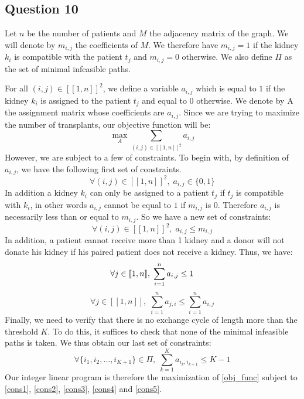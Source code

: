 \documentclass[english]{article}
\begin{document}
\subsection*{Question 10}

Let $n$ be the number of patients and $M$ the adjacency matrix of the graph. We will denote by $ m_ {i, j} $ the coefficients of $M$. We therefore have $m_{i, j} = 1$ if the kidney $k_i$ is compatible with
the patient $t_j$ and $m_{i, j} = 0$ otherwise. We also define $\Pi$ as the set of minimal infeasible paths. 

For all $(i, j) \in {[\![1, n]\!]}^2$, we define a variable $a_{i,j}$ which is equal to $1$ if the kidney $k_i$ is assigned to the patient $t_j$ and equal to $0$ otherwise. We denote by A the assignment matrix whose coefficients are $a_{i, j}$. Since we are trying to maximize the number of transplants, our objective function will be:
\begin{equation}\label{obj_func}
    \max_{A} \sum_{(i, j) \in {[\![1, n]\!]}^2} a_{i,j}
\end{equation}
However, we are subject to a few of constraints. To begin with, by definition of $a_{i, j}$, we have the following first set of constraints.
\begin{equation}\label{cons1}
    \forall (i, j) \in {[\![1, n]\!]}^2, \; a_{i,j} \in \{0, 1\}
\end{equation}
In addition a kidney $ k_i $ can only be assigned to a patient $ t_j $ if $ t_j $ is compatible with $ k_i $, in other words $ a_{i,j} $ cannot be equal to $1$ if $ m_{i,j} $ is $0$. Therefore $ a_{i,j} $ is necessarily less than or equal to $ m_{i,j} $. So we have a new set of constraints:
\begin{equation}\label{cons2}
    \forall (i, j) \in {[\![1, n]\!]}^2, \; a_{i,j} \leq m_{i,j}
\end{equation}
In addition, a patient cannot receive more than 1 kidney and a donor will not donate his kidney if his paired patient does not receive a kidney. Thus, we have:
\begin{equation}\label{cons3}
    \forall j \in [\![1, n]\!], \; \sum_{i = 1}^{n} a_{i,j} \leq 1\\
\end{equation}
\begin{equation}\label{cons4}
    \forall j \in [\![1, n]\!], \; \sum_{i = 1}^{n} a_{j,i} \leq \sum_{i = 1}^{n} a_{i,j}
\end{equation}
Finally, we need to verify that there is no exchange cycle of length more than the threshold $K$. To do this, it suffices to check that none of the minimal infeasible paths is taken. We thus obtain our last set of constraints:
\begin{equation}\label{cons5}
    \forall \{i_1, i_2, \dots, i_{K+1} \} \in \Pi, \; \sum_{k = 1}^{K} a_{i_k,i_{k+1}} \leq K - 1
\end{equation}
Our integer linear program is therefore the maximization of \ref{obj_func} subject to \ref{cons1}, \ref{cons2}, \ref{cons3}, \ref{cons4} and \ref{cons5}.
\end{document}
